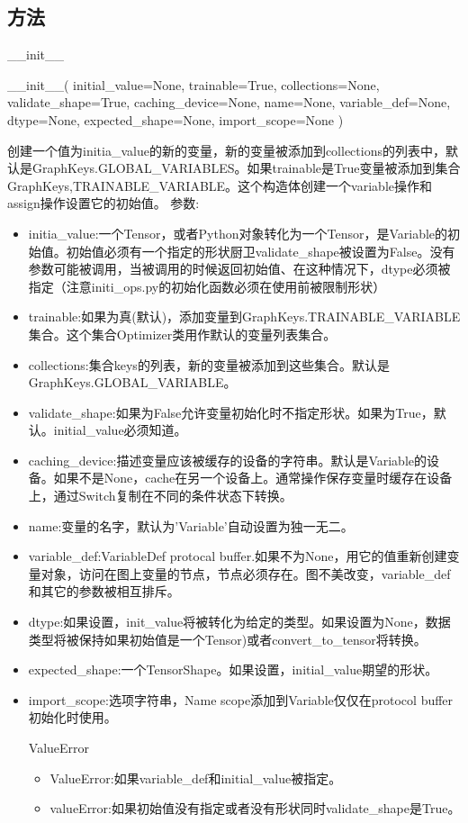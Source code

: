 \subsection{方法}
\_\_init\_\_
\begin{python}
__init__(
    initial_value=None,
    trainable=True,
    collections=None,
    validate_shape=True,
    caching_device=None,
    name=None,
    variable_def=None,
    dtype=None,
    expected_shape=None,
    import_scope=None
)
\end{python}
创建一个值为initia\_value的新的变量，新的变量被添加到collections的列表中，默认是GraphKeys.GLOBAL\_VARIABLES。如果trainable是True变量被添加到集合GraphKeys,TRAINABLE\_VARIABLE。这个构造体创建一个variable操作和assign操作设置它的初始值。
参数:
\begin{itemize}
\item initia\_value:一个Tensor，或者Python对象转化为一个Tensor，是Variable的初始值。初始值必须有一个指定的形状厨卫validate\_shape被设置为False。没有参数可能被调用，当被调用的时候返回初始值、在这种情况下，dtype必须被指定（注意initi\_ops.py的初始化函数必须在使用前被限制形状）
\item trainable:如果为真(默认)，添加变量到GraphKeys.TRAINABLE\_VARIABLE集合。这个集合Optimizer类用作默认的变量列表集合。
\item collections:集合keys的列表，新的变量被添加到这些集合。默认是GraphKeys.GLOBAL\_VARIABLE。
\item validate\_shape:如果为False允许变量初始化时不指定形状。如果为True，默认。initial\_value必须知道。
\item caching\_device:描述变量应该被缓存的设备的字符串。默认是Variable的设备。如果不是None，cache在另一个设备上。通常操作保存变量时缓存在设备上，通过Switch复制在不同的条件状态下转换。
\item name:变量的名字，默认为'Variable'自动设置为独一无二。
\item variable\_def:VariableDef protocal buffer.如果不为None，用它的值重新创建变量对象，访问在图上变量的节点，节点必须存在。图不美改变，variable\_def和其它的参数被相互排斥。
\item dtype:如果设置，init\_value将被转化为给定的类型。如果设置为None，数据类型将被保持如果初始值是一个Tensor)或者convert\_to\_tensor将转换。
\item expected\_shape:一个TensorShape。如果设置，initial\_value期望的形状。
\item import\_scope:选项字符串，Name scope添加到Variable仅仅在protocol buffer初始化时使用。
\item[ValueError]
\begin{itemize}
	\item ValueError:如果variable\_def和initial\_value被指定。
	\item valueError:如果初始值没有指定或者没有形状同时validate\_shape是True。
\end{itemize}
\end{itemize}
